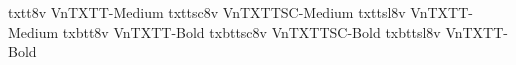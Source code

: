 \documentclass[test]{vnsample}
\begin{document}
\begin{shortsample}
 {txtt8v}        {VnTXTT-Medium}
 {txttsc8v}        {VnTXTTSC-Medium}
 {txttsl8v}        {VnTXTT-Medium}
 {txbtt8v}        {VnTXTT-Bold}
 {txbttsc8v}        {VnTXTTSC-Bold}
 {txbttsl8v}        {VnTXTT-Bold}
\end{shortsample}
\end{document}
